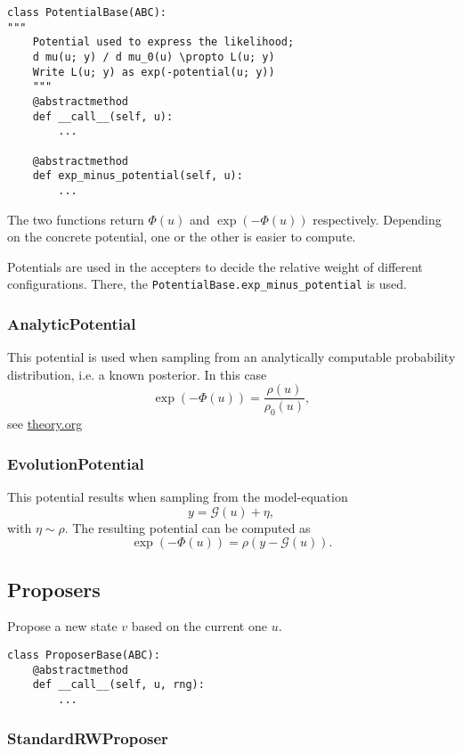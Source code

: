 \documentclass[11pt]{article}
\newcommand{\G}[1]{{\mathcal{G} \left( #1 \right)}}
\begin{document}
\begin{verbatim}
class PotentialBase(ABC):
"""
    Potential used to express the likelihood;
    d mu(u; y) / d mu_0(u) \propto L(u; y)
    Write L(u; y) as exp(-potential(u; y))
    """
    @abstractmethod
    def __call__(self, u):
        ...

    @abstractmethod
    def exp_minus_potential(self, u):
        ...
\end{verbatim}

The two functions return \(\Phi(u)\) and \(\exp(-\Phi(u))\) respectively. Depending on the
concrete potential, one or the other is easier to compute.

Potentials are used in the accepters to decide the relative weight of different configurations.
There, the \texttt{PotentialBase.exp\_minus\_potential} is used.
\subsubsection{AnalyticPotential}
\label{sec:org36c7d0e}

This potential is used when sampling from an analytically computable probability distribution,
i.e. a known posterior. In this case
$$\exp(-\Phi(u)) = \frac{\rho(u)}{\rho_0(u)},$$
see \url{theory.org}
\subsubsection{EvolutionPotential}
\label{sec:orge8f2c16}

This potential results when sampling from the model-equation
$$y = \G{u} + \eta,$$
with \(\eta \sim \rho\). The resulting potential can be computed as
$$\exp(-\Phi(u)) = \rho(y - \G{u}).$$

\subsection{Proposers}
\label{sec:orgf8647b5}

Propose a new state \(v\) based on the current one \(u\).

\begin{verbatim}
class ProposerBase(ABC):
    @abstractmethod
    def __call__(self, u, rng):
        ...
\end{verbatim}

\subsubsection{StandardRWProposer}
\label{sec:org037df9b}
\end{document}
